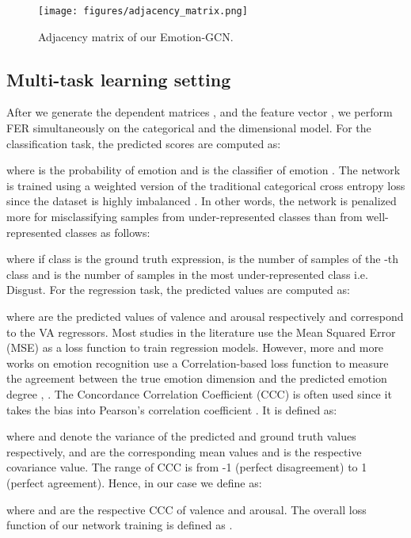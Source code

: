 \documentclass[a4paper, 10pt, conference]{ieeeconf}      \usepackage{FG2021}
\begin{document}
\begin{figure}[t]
    \centering
    \texttt{[image: figures/adjacency\_matrix.png]}
    \caption{Adjacency matrix of our Emotion-GCN.}
    \label{fig:adj_matrix}
\end{figure}

\subsection{Multi-task learning setting}

After we generate the dependent matrices ,  and the feature vector , we perform FER simultaneously on the categorical and the dimensional model. For the classification task, the predicted scores are computed as:


where  is the probability of emotion  and  is the classifier of emotion . The network is trained using a weighted version of the traditional categorical cross entropy loss  since the dataset is highly imbalanced \cite{mollahosseini2017affectnet}. In other words, the network is penalized more for misclassifying samples from under-represented classes than from well-represented classes as follows:




where  if class  is the ground truth expression,  is the number of samples of the -th class and  is the number of samples in the most under-represented class i.e. Disgust. For the regression task, the predicted values are computed as:

where  are the predicted values of valence and arousal respectively and  correspond to the VA regressors. Most studies in the literature use the Mean Squared Error (MSE) as a loss function to train regression models. However, more and more works on emotion recognition use a Correlation-based loss function to measure the agreement between the true emotion dimension and the predicted emotion degree \cite{kollias2019expression}, \cite{han2017hard}. The Concordance Correlation Coefficient (CCC) is often used since it takes the bias into Pearson’s correlation coefficient \cite{atmaja2020evaluation}. It is defined as:


where  and  denote the variance of the predicted and ground truth values respectively,  and  are the corresponding mean values and  is the respective covariance value. The range of CCC is from -1 (perfect disagreement) to 1 (perfect agreement). Hence, in our case we define  as:


where  and  are the respective CCC of valence and arousal. The overall loss function of our network training is defined as .
\end{document}
